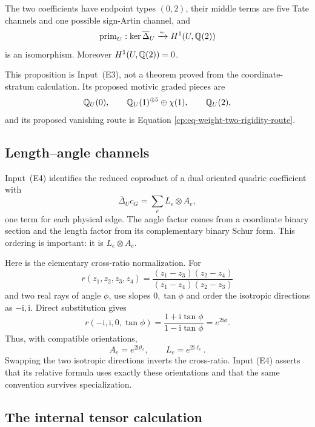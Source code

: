 \begin{proposition}
\label{cp:prop-weight-calculation}
The two coefficients have endpoint types \((0,2)\), their middle terms are
five Tate channels and one possible sign-Artin channel, and
\[
 \operatorname{prim}_U:
 \ker\overline\Delta_U\xrightarrow{\sim}H^1(U,\mathbb Q(2))
\]
is an isomorphism.  Moreover \(H^1(U,\mathbb Q(2))=0\).
\end{proposition}

This proposition is Input~\textup{(E3)}, not a theorem proved from the
coordinate-stratum calculation.  Its proposed motivic graded pieces are
\[
 \mathbb Q_U(0),\qquad \mathbb Q_U(1)^{\oplus5}\oplus\chi(1),\qquad\mathbb Q_U(2),
\]
and its proposed vanishing route is Equation
\eqref{cp:eq-weight-two-rigidity-route}.

\subsection{Length--angle channels}

Input~\textup{(E4)} identifies the reduced coproduct of a dual oriented
quadric coefficient with
\begin{equation}
 \overline\Delta_U c_G=\sum_e L_e\otimes A_e,
 \label{cp:eq-angle-length-coproduct}
\end{equation}
one term for each physical edge.  The angle factor comes from a coordinate
binary section and the length factor from its complementary binary Schur
form.  This ordering is important: it is \(L_e\otimes A_e\).

Here is the elementary cross-ratio normalization.  For
\[
 r(z_1,z_2,z_3,z_4)
 =\frac{(z_1-z_3)(z_2-z_4)}
        {(z_1-z_4)(z_2-z_3)}
\]
and two real rays of angle \(\phi\), use slopes \(0,\tan\phi\) and order the
isotropic directions as \(-\mathrm i,\mathrm i\).  Direct substitution gives
\[
 r(-\mathrm i,\mathrm i,0,\tan\phi)
 =\frac{1+\mathrm i\tan\phi}{1-\mathrm i\tan\phi}
 =e^{2\mathrm i\phi}.
\]
Thus, with compatible orientations,
\begin{equation}
 A_e=e^{2\mathrm i\vartheta_e},
 \qquad L_e=e^{2\mathrm i\ell_e}.
 \label{cp:eq-cross-ratio-phases}
\end{equation}
Swapping the two isotropic directions inverts the cross-ratio.  Input
\textup{(E4)} asserts that its relative formula uses exactly these
orientations and that the same convention survives specialization.

\subsection{The internal tensor calculation}

